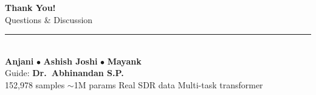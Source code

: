 \documentclass[aspectratio=169, 10pt]{beamer}
\begin{document}
{
\begin{frame}[plain]
\vfill
\begin{center}
  {\Huge\bfseries\color{navy} Thank You!}\\[10pt]
  {\Large\color{royalblue} Questions \& Discussion}\\[12pt]
  \textcolor{royalblue}{\rule{7cm}{1pt}}\\[12pt]
  {\normalsize
    \textbf{Anjani} \;\;$\bullet$\;\;
    \textbf{Ashish Joshi} \;\;$\bullet$\;\;
    \textbf{Mayank}}\\[6pt]
  {\small Guide: \textbf{Dr.\ Abhinandan S.P.}}\\[12pt]
  {\small\color{gray}
    152{,}978 samples \;\textbar\;
    $\sim$1M params \;\textbar\;
    Real SDR data \;\textbar\;
    Multi-task transformer}
\end{center}
\vfill
\end{frame}
}
\end{document}
